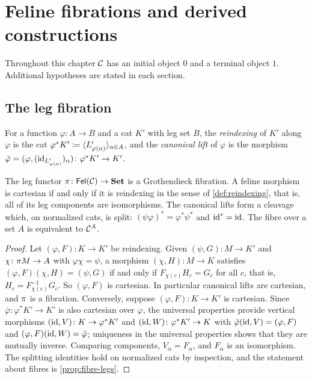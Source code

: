 \chapter{Feline fibrations and derived constructions}\label{ch:fibrations}

\begin{assumption}\label{ass:ch10}
Throughout this chapter $\mathcal{C}$ has an initial object $0$ and a terminal object
$1$. Additional hypotheses are stated in each section.
\end{assumption}

\section{The leg fibration}\label{sec:leg-fibration}

\begin{definition}\label{def:reindexing-functor}
For a function $\varphi\colon A\to B$ and a cat $K'$ with leg set $B$, the
\emph{reindexing} of $K'$ along $\varphi$ is the cat
$\varphi^*K'\coloneqq\langle L'_{\varphi(\alpha)}\rangle_{\alpha\in A}$, and the
\emph{canonical lift} of $\varphi$ is the morphism
$\bar\varphi=(\varphi,(\mathrm{id}_{L'_{\varphi(\alpha)}})_\alpha)\colon\varphi^*K'\to K'$.
\end{definition}

\begin{theorem}\label{thm:fibration}
The leg functor $\pi\colon\mathsf{Fel}(\mathcal{C})\to\mathbf{Set}$ is a Grothendieck fibration. A
feline morphism is cartesian if and only if it is reindexing in the sense of
\cref{def:reindexing}, that is, all of its leg components are isomorphisms.
The canonical lifts form a cleavage which, on normalized cats, is split:
$(\psi\varphi)^*=\varphi^*\psi^*$ and $\mathrm{id}^*=\mathrm{id}$. The fibre over a set $A$ is
equivalent to $\mathcal{C}^A$.
\end{theorem}

\begin{proof}
Let $(\varphi,F)\colon K\to K'$ be reindexing. Given $(\psi,G)\colon M\to K'$
and $\chi\colon\pi M\to A$ with $\varphi\chi=\psi$, a morphism
$(\chi,H)\colon M\to K$ satisfies $(\varphi,F)(\chi,H)=(\psi,G)$ if and only if
$F_{\chi(c)}H_c=G_c$ for all $c$, that is, $H_c=F_{\chi(c)}^{-1}G_c$. So
$(\varphi,F)$ is cartesian. In particular canonical lifts are cartesian, and
$\pi$ is a fibration. Conversely, suppose $(\varphi,F)\colon K\to K'$ is
cartesian. Since $\bar\varphi\colon\varphi^*K'\to K'$ is also cartesian over
$\varphi$, the universal properties provide vertical morphisms
$(\mathrm{id},V)\colon K\to\varphi^*K'$ and $(\mathrm{id},W)\colon\varphi^*K'\to K$ with
$\bar\varphi(\mathrm{id},V)=(\varphi,F)$ and $(\varphi,F)(\mathrm{id},W)=\bar\varphi$; uniqueness
in the universal properties shows that they are mutually inverse. Comparing
components, $V_\alpha=F_\alpha$, and $F_\alpha$ is an isomorphism. The
splitting identities hold on normalized cats by inspection, and the statement
about fibres is \cref{prop:fibre-legs}.
\end{proof}

